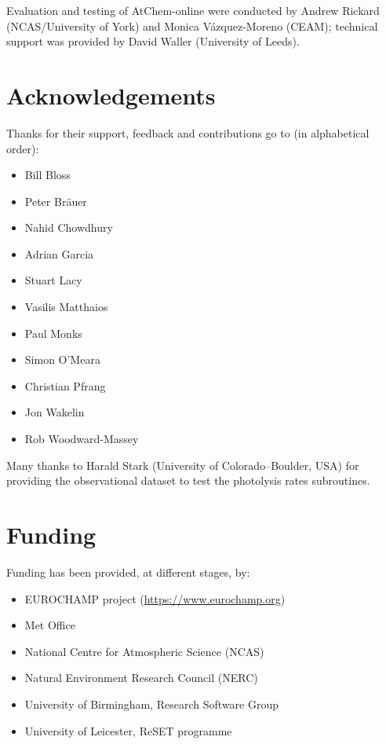 Evaluation and testing of AtChem-online were conducted by Andrew Rickard (NCAS/University of
York) and Monica V{\'a}zquez-Moreno (CEAM); technical support was provided by David Waller
(University of Leeds).

\section{Acknowledgements} \label{sec:acknowledgements}

Thanks for their support, feedback and contributions go to (in alphabetical order):

\begin{itemize}
\item Bill Bloss
\item Peter Br{\"a}uer
\item Nahid Chowdhury
\item Adrian Garcia
\item Stuart Lacy
\item Vasilis Matthaios
\item Paul Monks
\item Simon O'Meara
\item Christian Pfrang
\item Jon Wakelin
\item Rob Woodward-Massey
\end{itemize}

Many thanks to Harald Stark (University of Colorado--Boulder, USA) for providing the
observational dataset to test the photolysis rates subroutines.

\section{Funding} \label{sec:funding}

Funding has been provided, at different stages, by:

\begin{itemize}
\item EUROCHAMP project (\url{https://www.eurochamp.org})
\item Met Office
\item National Centre for Atmospheric Science (NCAS)
\item Natural Environment Research Council (NERC)
\item University of Birmingham, Research Software Group
\item University of Leicester, ReSET programme
\end{itemize}
